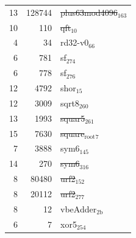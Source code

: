 \begin{center}
\begin{tabular}{rrl}
13 & 128744 & \sout{plus63mod4096\(_{\text{163}}\)}\\
10 & 110 & \sout{qft\(_{\text{10}}\)}\\
4 & 34 & rd32-v0\(_{\text{66}}\)\\
6 & 781 & sf\(_{\text{274}}\)\\
6 & 778 & sf\(_{\text{276}}\)\\
12 & 4792 & shor\(_{\text{15}}\)\\
12 & 3009 & sqrt8\(_{\text{260}}\)\\
13 & 1993 & \sout{squar5\(_{\text{261}}\)}\\
15 & 7630 & \sout{square\(_{\text{root}}\)\(_{\text{7}}\)}\\
7 & 3888 & sym6\(_{\text{145}}\)\\
14 & 270 & \sout{sym6\(_{\text{316}}\)}\\
8 & 80480 & \sout{urf2\(_{\text{152}}\)}\\
8 & 20112 & \sout{urf2\(_{\text{277}}\)}\\
8 & 12 & vbeAdder\(_{\text{2b}}\)\\
6 & 7 & xor5\(_{\text{254}}\)\\
\end{tabular}
\end{center}


